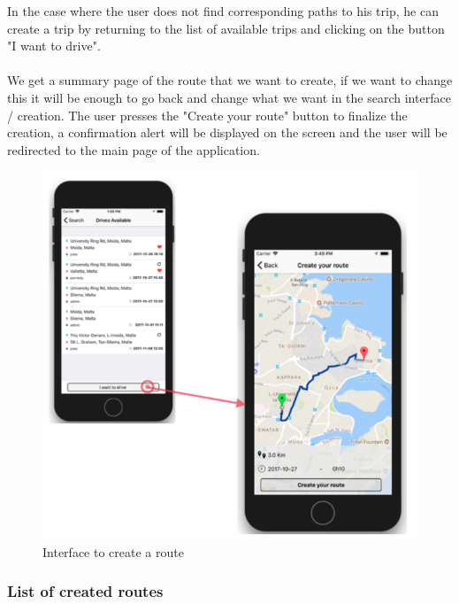 In the case where the user does not find corresponding paths to his trip, he can create a trip by returning to the list of available trips and clicking on the button "I want to drive".
\\\\
We get a summary page of the route that we want to create, if we want to change this it will be enough to go back and change what we want in the search interface / creation. The user presses the "Create your route" button to finalize the creation, a confirmation alert will be displayed on the screen and the user will be redirected to the main page of the application.

\newpage

\begin{figure}[h!]
\begin{center}
\includegraphics[scale = 0.3]{diagrams/CreateRoute.png} 
\end{center}
\caption{Interface to create a route}
\end{figure}


\subsubsection{List of created routes}

